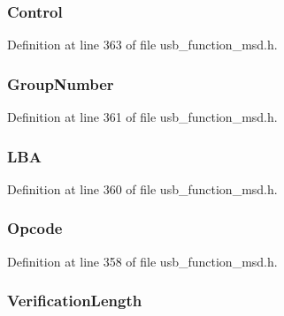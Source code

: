 \subsubsection[{Control}]{ Control}\label{struct_verify_c_b_a5dc24656c27deb12af74c98930f0bfc5}


Definition at line 363 of file usb\+\_\+function\+\_\+msd.\+h.

\hypertarget{struct_verify_c_b_a6016c3942d93a2a734fa1fa61f69747b}{}
\subsubsection[{Group\+Number}]{ Group\+Number}\label{struct_verify_c_b_a6016c3942d93a2a734fa1fa61f69747b}


Definition at line 361 of file usb\+\_\+function\+\_\+msd.\+h.

\hypertarget{struct_verify_c_b_a025861a8c903e77ef60526f18da19bb1}{}
\subsubsection[{L\+B\+A}]{ L\+B\+A}\label{struct_verify_c_b_a025861a8c903e77ef60526f18da19bb1}


Definition at line 360 of file usb\+\_\+function\+\_\+msd.\+h.

\hypertarget{struct_verify_c_b_a3ac7536b907732d60214ae553910eed9}{}
\subsubsection[{Opcode}]{ Opcode}\label{struct_verify_c_b_a3ac7536b907732d60214ae553910eed9}


Definition at line 358 of file usb\+\_\+function\+\_\+msd.\+h.

\hypertarget{struct_verify_c_b_ae4f238bf1c685f44d90bc7d825bbfe59}{}
\subsubsection[{Verification\+Length}]{ Verification\+Length}\label{struct_verify_c_b_ae4f238bf1c685f44d90bc7d825bbfe59}


